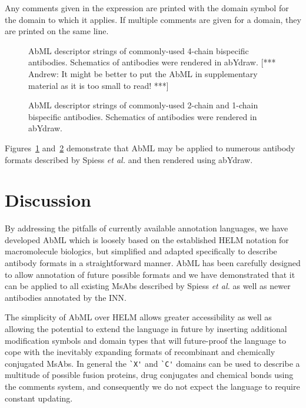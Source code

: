 \documentclass[a4paper]{article}
\newcommand{\etal}{\emph{et al.}}
\newcommand{\andrew}[1]{{\color{red} [*** Andrew: #1 ***]}}
\let\shortcite\cite
\begin{document}
Any
comments given in the expression are printed with the domain symbol for
the domain to which it applies. If multiple comments are
given for a domain, they are printed on the same line. 

\begin{figure}
\caption{\label{fig:2} AbML descriptor strings of commonly-used
4-chain bispecific antibodies. Schematics of antibodies were rendered
in abYdraw. \andrew{It might be better to put the AbML in supplementary
  material as it is too small to read!} }
\end{figure}

\begin{figure}
\caption{\label{fig:3} AbML descriptor strings of commonly-used
2-chain and 1-chain bispecific antibodies. Schematics of antibodies
were rendered in abYdraw.} 
\end{figure}

Figures~\ref{fig:2} and~\ref{fig:3} demonstrate that AbML may be
applied to numerous antibody formats described by Spiess \etal
\shortcite{spiess:2015} and then rendered using abYdraw.

\section{Discussion}

By addressing the pitfalls of currently available annotation languages,
we have developed AbML which is loosely 
based on the established HELM notation for macromolecule
biologics, but simplified and adapted specifically to describe antibody
formats in a straightforward  manner.
AbML has been carefully designed to allow annotation of future possible
formats and we have demonstrated that it can be applied to all existing
MsAbs described by Spiess \etal \shortcite{spiess:2015} as well as
newer antibodies annotated by the INN.

The simplicity of AbML over HELM allows greater accessibility
as well as allowing the potential to extend the language in future by inserting additional modification
symbols and domain types that will future-proof the language to cope
with the inevitably expanding formats of recombinant and chemically
conjugated MsAbs. In general the \verb|`X'| and \verb|`C'|
domains can be used to describe a multitude of possible fusion proteins,
drug conjugates and chemical bonds using the comments system, and consequently
we do not expect the language to require constant updating.
\end{document}
